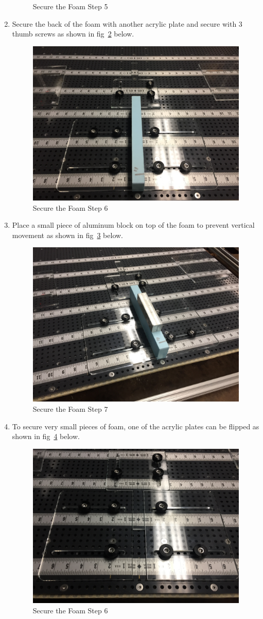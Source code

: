 \documentclass[titlepage,12pt,letter]{report}
\numberwithin{equation}{chapter}
\begin{document}
\begin{enumerate}[noitemsep,topsep=0pt]
\begin{figure} [H]
		\caption{Secure the Foam Step 5}
		\label{fig:foam2}
	\end{figure}
	\item Secure the back of the foam with another acrylic plate and secure with 3 thumb screws as shown in fig~\ref{fig:foam3} below.
	\begin{figure} [H]
		\includegraphics[width = 0.6\linewidth]{./Figures/secure_foam/3.jpg}
		\caption{Secure the Foam Step 6}
		\label{fig:foam3}
	\end{figure}
	\item Place a small piece of aluminum block on top of the foam to prevent vertical movement as shown in fig~\ref{fig:foam4} below.
	\begin{figure} [H]
		\includegraphics[width = 0.6\linewidth]{./Figures/secure_foam/4.jpg}
		\caption{Secure the Foam Step 7}
		\label{fig:foam4}
	\end{figure}
	\item To secure very small pieces of foam, one of the acrylic plates can be flipped as shown in fig~\ref{fig:foam5} below.
	\begin{figure} [H]
		\includegraphics[width = 0.6\linewidth]{./Figures/secure_foam/5.jpg}
		\caption{Secure the Foam Step 6}
		\label{fig:foam5}
	\end{figure}
\end{enumerate}
\end{document}
